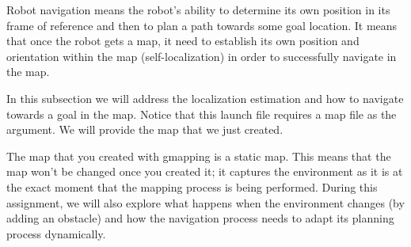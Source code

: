 \documentclass[12pt]{article}
\begin{document}
Robot navigation means the robot's ability to determine its own position in its frame of reference and then to plan a path towards some goal location. It means that 
once the robot gets a map, it need to establish its own position and orientation within the map (self-localization) in order to successfully navigate in the map. 

In this subsection we will address the localization estimation and how to navigate towards a goal in the map. Notice that this launch file requires a map file as the argument. We will provide the map that we just created.

The map that you created with gmapping is a static map. This means that the map won't be changed once you created it; it captures the environment as it is at the exact moment that the mapping process is being performed. During this assignment, we will also explore  what happens when the environment changes (by adding an obstacle) and how the navigation process needs to adapt its planning process dynamically.
\end{document}
